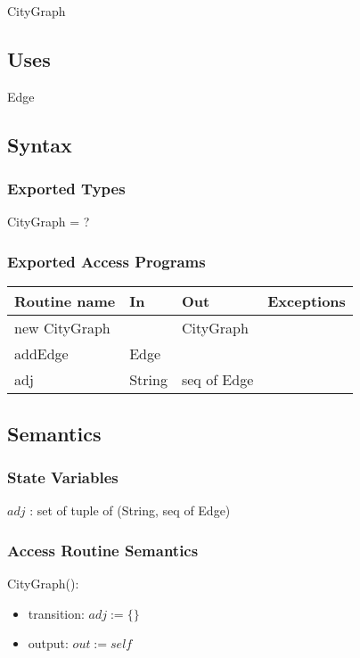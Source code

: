 \documentclass[12pt]{article}
\begin{document}
CityGraph

\subsection* {Uses}

Edge

\subsection* {Syntax}

\subsubsection* {Exported Types}

CityGraph = ?


\subsubsection* {Exported Access Programs}

\begin{tabular}{| l | l | l | l |}
\hline
\textbf{Routine name} & \textbf{In} & \textbf{Out} & \textbf{Exceptions}\\
\hline
new CityGraph &  & CityGraph & \\
\hline
addEdge & Edge &  & \\
\hline
adj & String & seq of Edge & \\
\hline
\end{tabular}

\newpage

\subsection* {Semantics}

\subsubsection* {State Variables}

$\mathit{adj}$ : set of tuple of (String, seq of Edge)


\subsubsection* {Access Routine Semantics}

CityGraph():
\begin{itemize}
\item transition: $adj := \{\}$
\item output: $\mathit{out} := \mathit{self}$
\end{itemize}
\end{document}
